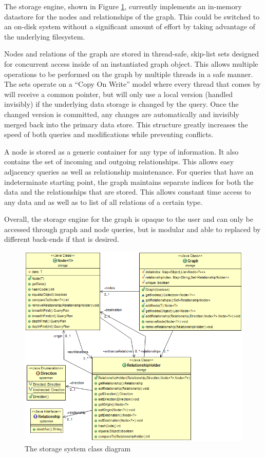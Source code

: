 \documentclass[11pt]{article}
\begin{document}
The storage engine, shown in Figure \ref{fig:storage}, currently implements an in-memory datastore for the nodes and relationships of the graph. This could be switched to an on-disk system without a significant amount of effort by taking advantage of the underlying filesystem.

Nodes and relations of the graph are stored in thread-safe, skip-list sets designed for concurrent access inside of an instantiated graph object. This allows multiple operations to be performed on the graph by multiple threads in a safe manner. The sets operate on a “Copy On Write” model where every thread that comes by will receive a common pointer, but will only use a local version (handled invisibly) if the underlying data storage is changed by the query. Once the changed version is committed, any changes are automatically and invisibly merged back into the primary data store. This structure greatly increases the speed of both queries and modifications while preventing conflicts.

A node is stored as a generic container for any type of information. It also contains the set of incoming and outgoing relationships. This allows easy adjacency queries as well as relationship maintenance. For queries that have an indeterminate starting point, the graph maintains separate indices for both the data and the relationships that are stored. This allows constant time access to any data and as well as to list of all relations of a certain type.

Overall, the storage engine for the graph is opaque to the user and can only be accessed through graph and node queries, but is modular and able to replaced by different back-ends if that is desired.

\begin{figure}[H]
\centering
\includegraphics[scale=0.65]{uml.png}
\caption{The storage system class diagram}
\label{fig:storage}
\end{figure}
\end{document}
